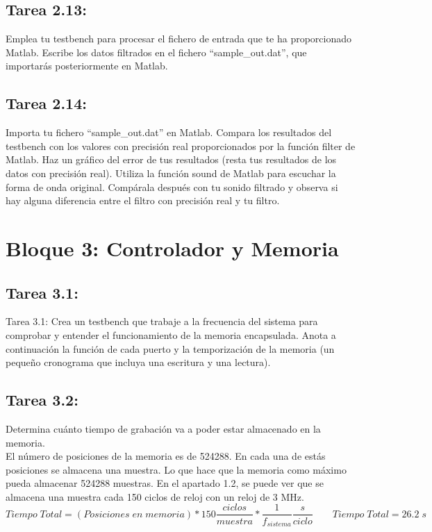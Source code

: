 \documentclass{article}
\begin{document}
\subsection{Tarea 2.13:}
Emplea tu testbench para procesar el fichero de entrada que te ha proporcionado
Matlab. Escribe los datos filtrados en el fichero “sample{\_}out.dat”, que importarás posteriormente en Matlab.

\subsection{Tarea 2.14:}
Importa tu fichero ``sample{\_}out.dat'' en Matlab. Compara los resultados del testbench con los valores con precisión real proporcionados por la función filter de Matlab. Haz un gráfico del error de tus resultados (resta tus resultados de los datos con precisión real).
Utiliza la función sound de Matlab para escuchar la forma de onda original. Compárala después con tu sonido filtrado y observa si hay alguna diferencia entre el filtro con precisión real y tu filtro.

\section{Bloque 3: Controlador y Memoria}

\subsection{Tarea 3.1:}
Tarea 3.1:
Crea un testbench que trabaje a la frecuencia del sistema para comprobar y entender el funcionamiento de la memoria encapsulada. Anota a continuación la función de cada
puerto y la temporización de la memoria (un pequeño cronograma que incluya una escritura y una lectura).

\subsection{Tarea 3.2:}

Determina cuánto tiempo de grabación va a poder estar almacenado en la memoria.\\

El número de posiciones de la memoria es de 524288. En cada una de estás posiciones se almacena una muestra. Lo que hace que la memoria como máximo pueda almacenar 524288 muestras. En el apartado 1.2, se puede ver que se almacena una muestra cada 150 ciclos de reloj con un reloj de 3 MHz.
\[ Tiempo \; Total = (Posiciones \; en \;memoria) * 150 \dfrac{ciclos}{muestra}* \dfrac{1}{f_{sistema}} \frac{s}{ciclo} \qquad Tiempo \; Total= 26.2 \;s\]
\end{document}
